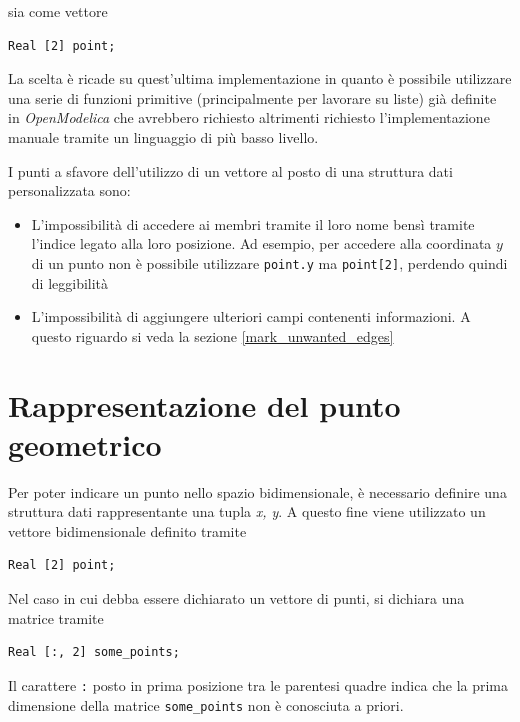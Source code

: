 \documentclass[11pt,a4paper]{report}
\begin{document}
sia come vettore

\begin{lstlisting}[language=Modelica]
Real [2] point;
\end{lstlisting}

La scelta è ricade su quest'ultima implementazione in quanto è possibile utilizzare una serie di funzioni primitive (principalmente per lavorare su liste) già definite in \textit{OpenModelica} che avrebbero richiesto altrimenti richiesto l'implementazione manuale tramite un linguaggio di più basso livello.

I punti a sfavore dell'utilizzo di un vettore al posto di una struttura dati personalizzata sono:

\begin{itemize}
	\item L'impossibilità di accedere ai membri tramite il loro nome bensì tramite l'indice legato alla loro posizione. Ad esempio, per accedere alla coordinata $y$ di un punto non è possibile utilizzare \verb|point.y| ma \verb|point[2]|, perdendo quindi di leggibilità
	\item L'impossibilità di aggiungere ulteriori campi contenenti informazioni. A questo riguardo si veda la sezione \ref{mark_unwanted_edges}
\end{itemize}

\section{Rappresentazione del punto geometrico}

Per poter indicare un punto nello spazio bidimensionale, è necessario definire una struttura dati rappresentante una tupla \textit{x, y}. A questo fine viene utilizzato un vettore bidimensionale definito tramite

\begin{lstlisting}[language=Modelica]
Real [2] point;
\end{lstlisting}

Nel caso in cui debba essere dichiarato un vettore di punti, si dichiara una matrice tramite

\begin{lstlisting}[language=Modelica]
Real [:, 2] some_points;
\end{lstlisting}

Il carattere \verb|:| posto in prima posizione tra le parentesi quadre indica che la prima dimensione della matrice \verb|some_points| non è conosciuta a priori.
\end{document}
